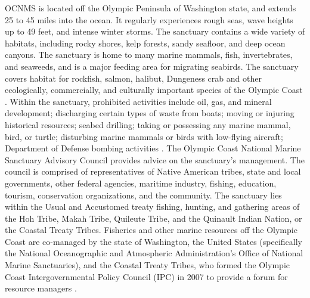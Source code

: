 \documentclass[12pt,twoside]{reedthesis}
\begin{document}
OCNMS is located off the Olympic Peninsula of Washington state, and extends 25 to 45 miles into the ocean. It regularly experiences rough seas, wave heights up to 49 feet, and intense winter storms. The sanctuary contains a wide variety of habitats, including rocky shores, kelp forests, sandy seafloor, and deep ocean canyons. The sanctuary is home to many marine mammals, fish, invertebrates, and seaweeds, and is a major feeding area for migrating seabirds. The sanctuary covers habitat for rockfish, salmon, halibut, Dungeness crab and other ecologically, commercially, and culturally important species of the Olympic Coast \autocite{FishOlympicCoast}.  Within the sanctuary, prohibited activities include oil, gas, and mineral development; discharging certain types of waste from boats; moving or injuring historical resources; seabed drilling; taking or possessing any marine mammal, bird, or turtle; disturbing marine mammals or birds with low-flying aircraft; Department of Defense bombing activities \autocite{15CFRPart}. The Olympic Coast National Marine Sanctuary Advisory Council provides advice on the sanctuary's management. The council is comprised of representatives of Native American tribes, state and local governments, other federal agencies, maritime industry, fishing, education, tourism, conservation organizations, and the community. The sanctuary lies within the Usual and Accustomed treaty fishing, hunting, and gathering areas of the Hoh Tribe, Makah Tribe, Quileute Tribe, and the Quinault Indian Nation, or the Coastal Treaty Tribes. Fisheries and other marine resources off the Olympic Coast are co-managed by the state of Washington, the United States (specifically the National Oceanographic and Atmospheric Administration's Office of National Marine Sanctuaries), and the Coastal Treaty Tribes, who formed the Olympic Coast Intergovernmental Policy Council (IPC) in 2007 to provide a forum for resource managers \autocite{IntergovernmentalPolicyCouncil}.
\end{document}
